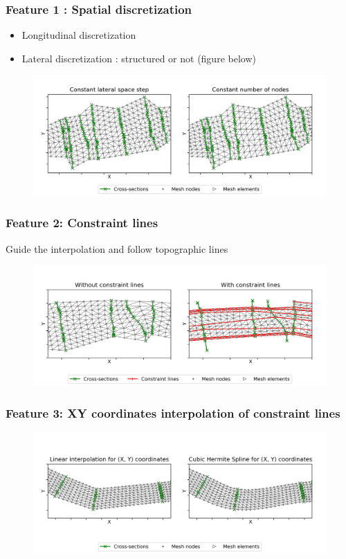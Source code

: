 \documentclass[10pt]{beamer}
\begin{document}
\begin{frame}\frametitle{Feature 1 : Spatial discretization}

\begin{itemize}
    \item Longitudinal discretization
    \item Lateral discretization : structured or not (figure below)
\end{itemize}

\begin{figure}[H]
    \centerline{\includegraphics[width=12cm]{figures/plot_comp_lateral-discretization.png}}
\end{figure}

\end{frame}


\begin{frame}\frametitle{Feature 2: Constraint lines}

Guide the interpolation and follow topographic lines

\begin{figure}[H]
    \centerline{\includegraphics[width=12cm]{figures/plot_comp_constraint-lines.png}}
\end{figure}

\end{frame}


\begin{frame}\frametitle{Feature 3: XY coordinates interpolation of constraint lines}

\begin{figure}[H]
    \centerline{\includegraphics[width=12cm]{figures/plot_comp_xy-interp.png}}
\end{figure}

\end{frame}
\end{document}
